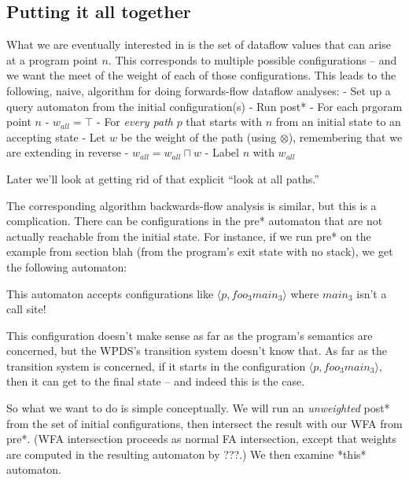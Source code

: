 \documentclass{article}
\newcommand{\Config}[2]{\ensuremath{\langle #1, #2 \rangle}}
\newcommand{\meet}{\sqcap}
\newcommand{\extend}{\otimes}
\begin{document}


\subsection{Putting it all together}

What we are eventually interested in is the set of dataflow
values that can arise at a program point $n$. This corresponds to
multiple possible configurations -- and we want the meet of the weight
of each of those configurations. This leads to the following, naive,
algorithm for doing forwards-flow dataflow analyses:
    - Set up a query automaton from the initial configuration(s)
    - Run post*
    - For each prgoram point $n$
          - $w_{all} = \top$
          - For \emph{every path} $p$ that starts with $n$ from an
            initial state to an accepting state
              - Let $w$ be the weight of the path (using $\extend$),
                remembering that we are extending in reverse
              - $w_{all} = w_{all} \meet w$
          - Label $n$ with $w_{all}$

Later we'll look at getting rid of that explicit ``look at all
paths.''

The corresponding algorithm backwards-flow analysis is similar, but
this is a complication. There can be configurations in the pre*
automaton that are not actually reachable from the initial state. For
instance, if we run pre* on the example from section blah (from the
program's exit state with no stack), we get the following automaton:

This automaton accepts configurations like \Config{p}{foo_3 main_3}
where $main_3$ isn't a call site!

This configuration doesn't make sense as far as the program's
semantics are concerned, but the WPDS's transition system doesn't know
that. As far as the transition system is concerned, if it starts in
the configuration \Config{p}{foo_3 main_3}, then it can get to the
final state -- and indeed this is the case. 

So what we want to do is simple conceptually. We will run an
\emph{unweighted} post* from the set of initial configurations, then
intersect the result with our WFA from pre*. (WFA intersection
proceeds as normal FA intersection, except that weights are computed
in the resulting automaton by ???.) We then examine *this* automaton.
\end{document}
